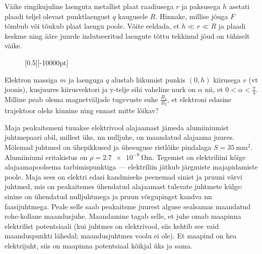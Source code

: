 \documentclass[10pt]{article}
\begin{document}

Väike ringikujuline laenguta metallist plaat raadiusega $r$ ja paksusega $h$ asetati plaadi teljel olevast punktlaengust $q$ kaugusele $R$. Hinnake, millise jõuga $F$ tõmbub või tõukub plaat laengu poole. Võite eeldada, et $h\ll r\ll R$ ja plaadi keskme ning ääre juurde indutseeritud laengute tõttu tekkinud jõud on tühiselt väike.
\probend
\bigskip


\begin{figure}
    \vspace{-50pt}
    \raisebox{-50pt}[0.5\dimexpr\height][-10000pt]{\magnetvali{}}    
    \vspace{-500pt}
\end{figure}



Elektron massiga $m$ ja laenguga $q$ alustab liikumist punkis $(0,h)$ kiirusega $v$ (vt joonis), kusjuures kiirusvektori ja y-telje sihi vaheline nurk on $\alpha$ nii, et $0<\alpha<\frac{\pi}{4}$. Milline peab olema magnetväljade tugevuste suhe $\frac{B_1}{B_2}$, et elektroni edasine trajektoor oleks kinnine ning ennast mitte lõikav?
\probend
\bigskip


Maja peakaitsmeni tuuakse elektrivool alajaamast jämeda alumiiniumist juhtmepaari abil, millest üks, nn nulljuhe, on maandatud alajaama juures. Mõlemad juhtmed on ühepikkused ja ühesuguse ristlõike pindalaga $S=\SI{35}{\mm\squared}$. Alumiiniumi eritakistus on $\rho=\SI{2.7e-8}{\ohm\m}$. Tegemist on elektriliini kõige alajaamapoolsema tarbimispunktiga --- elektriliin jätkub järgmiste majapidamiste poole. Maja sees on elektri edasi kandmiseks peenemad sinist ja pruuni värvi juhtmed, mis on peakaitsmes ühendatud alajaamast tulevate juhtmete külge: sinine on ühendatud nulljuhtmega ja pruun võrgupinget kandva nn faasijuhtmega. Peale selle saab peakaitsme juurest alguse sealsamas maandatud rohe-kollane maandusjuhe. Maandamine tagab selle, et juhe omab maapinna elektrilist potentsiaali (kui juhtmes on elektrivool, siis kehtib see vaid maanduspunkti lähedal; maandusjuhtmes voolu ei ole). Et maapind on hea elektrijuht, siis on maapinna potentsiaal kõikjal üks ja sama. 
\end{document}
